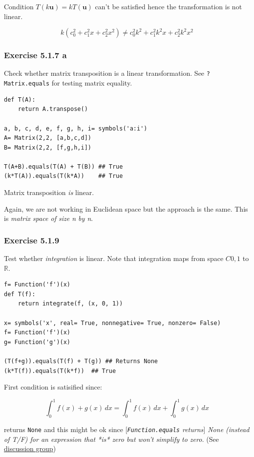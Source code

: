 Condition $T(k\mathbf{u}) = kT(\mathbf{u})$ can't be satisfied hence the
transformation is not linear.

$$
k \left(c_{0}^{2} + c_{1}^{2} x + c_{2}^{2} x^{2}\right) \neq c_{0}^{2} k^{2} + c_{1}^{2} k^{2} x + c_{2}^{2} k^{2} x^{2}
$$

\subsubsection{Exercise 5.1.7 a}

Check whether matrix transposition is a linear transformation. See \texttt{?Matrix.equals}
for testing matrix equality.

\begin{verbatim}
def T(A):
    return A.transpose()

a, b, c, d, e, f, g, h, i= symbols('a:i')
A= Matrix(2,2, [a,b,c,d])
B= Matrix(2,2, [f,g,h,i])

T(A+B).equals(T(A) + T(B)) ## True
(k*T(A)).equals(T(k*A))    ## True
\end{verbatim}

Matrix transposition \emph{is} linear.

Again, we are not working in Euclidean space but the approach is the same. This
is \emph{matrix space of size \emph{n} by \emph{n}}.

\subsubsection{Exercise 5.1.9}

Test whether \emph{integration} is linear. Note that integration maps from space
$C{0, 1}$ to $\mathbb{R}$.

\begin{verbatim}
f= Function('f')(x)
def T(f):
    return integrate(f, (x, 0, 1))
    
x= symbols('x', real= True, nonnegative= True, nonzero= False)
f= Function('f')(x)
g= Function('g')(x)

(T(f+g)).equals(T(f) + T(g)) ## Returns None
(k*T(f)).equals(T(k*f))  ## True
\end{verbatim}

First condition is satisified since:

$$
\int_{0}^{1} f{\left (x \right )} + g{\left (x \right )}\, dx = \int_{0}^{1} f{\left (x \right )}\, dx + \int_{0}^{1} g{\left (x \right )}\, dx
$$

\sympy returns \texttt{None} and this might be ok since \emph{$[$\texttt{Function.equals} returns$]$ None
(instead of T/F) for an expression that *is* zero but won't simplify to zero.}
(See \href{https://groups.google.com/forum/#!topic/sympy/xP_uM49pXeo}{\sympy discussion group})